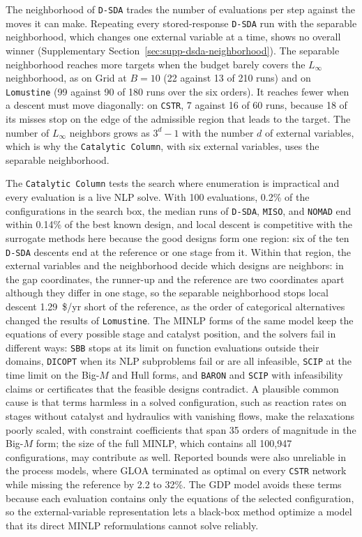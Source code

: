\documentclass{article}
\begin{document}
The neighborhood of \texttt{D-SDA} trades the number of evaluations per step against the moves it can make.
Repeating every stored-response \texttt{D-SDA} run with the separable neighborhood, which changes one external variable at a time, shows no overall winner (Supplementary Section~\ref{sec:supp-dsda-neighborhood}).
The separable neighborhood reaches more targets when the budget barely covers the \(L_\infty\) neighborhood, as on Grid at \(B=10\) (22 against 13 of 210 runs) and on \texttt{Lomustine} (99 against 90 of 180 runs over the six orders).
It reaches fewer when a descent must move diagonally: on \texttt{CSTR}, 7 against 16 of 60 runs, because 18 of its misses stop on the edge of the admissible region that leads to the target.
The number of \(L_\infty\) neighbors grows as \(3^d-1\) with the number \(d\) of external variables, which is why the \texttt{Catalytic Column}, with six external variables, uses the separable neighborhood.

The \texttt{Catalytic Column} tests the search where enumeration is impractical and every evaluation is a live NLP solve.
With 100 evaluations, 0.2\% of the configurations in the search box, the median runs of \texttt{D-SDA}, \texttt{MISO}, and \texttt{NOMAD} end within 0.14\% of the best known design, and local descent is competitive with the surrogate methods here because the good designs form one region: six of the ten \texttt{D-SDA} descents end at the reference or one stage from it.
Within that region, the external variables and the neighborhood decide which designs are neighbors: in the gap coordinates, the runner-up and the reference are two coordinates apart although they differ in one stage, so the separable neighborhood stops local descent 1.29~\$/yr short of the reference, as the order of categorical alternatives changed the results of \texttt{Lomustine}.
The MINLP forms of the same model keep the equations of every possible stage and catalyst position, and the solvers fail in different ways: \texttt{SBB} stops at its limit on function evaluations outside their domains, \texttt{DICOPT} when its NLP subproblems fail or are all infeasible, \texttt{SCIP} at the time limit on the Big-\(M\) and Hull forms, and \texttt{BARON} and \texttt{SCIP} with infeasibility claims or certificates that the feasible designs contradict.
A plausible common cause is that terms harmless in a solved configuration, such as reaction rates on stages without catalyst and hydraulics with vanishing flows, make the relaxations poorly scaled, with constraint coefficients that span 35 orders of magnitude in the Big-\(M\) form; the size of the full MINLP, which contains all 100,947 configurations, may contribute as well.
Reported bounds were also unreliable in the process models, where GLOA terminated as optimal on every \texttt{CSTR} network while missing the reference by 2.2 to 32\%.
The GDP model avoids these terms because each evaluation contains only the equations of the selected configuration, so the external-variable representation lets a black-box method optimize a model that its direct MINLP reformulations cannot solve reliably.
\end{document}
